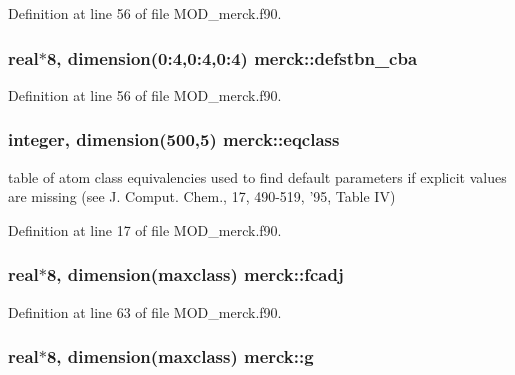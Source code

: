 Definition at line 56 of file M\-O\-D\-\_\-merck.\-f90.

\hypertarget{classmerck_a9738fd062edaa9f9d1d1330938269a2f}{
\subsubsection[{defstbn\-\_\-cba}]{\setlength{\rightskip}{0pt plus 5cm}real$\ast$8, dimension(0\-:4,0\-:4,0\-:4) merck\-::defstbn\-\_\-cba}}\label{classmerck_a9738fd062edaa9f9d1d1330938269a2f}


Definition at line 56 of file M\-O\-D\-\_\-merck.\-f90.

\hypertarget{classmerck_a8eadf59b7bbaa44a94d888299dcb8e35}{
\subsubsection[{eqclass}]{\setlength{\rightskip}{0pt plus 5cm}integer, dimension(500,5) merck\-::eqclass}}\label{classmerck_a8eadf59b7bbaa44a94d888299dcb8e35}


table of atom class equivalencies used to find default parameters if explicit values are missing (see J. Comput. Chem., 17, 490-\/519, '95, Table I\-V) 



Definition at line 17 of file M\-O\-D\-\_\-merck.\-f90.

\hypertarget{classmerck_a101cae3abb5ea422f3baccff3e448ad6}{
\subsubsection[{fcadj}]{\setlength{\rightskip}{0pt plus 5cm}real$\ast$8, dimension(maxclass) merck\-::fcadj}}\label{classmerck_a101cae3abb5ea422f3baccff3e448ad6}


Definition at line 63 of file M\-O\-D\-\_\-merck.\-f90.

\hypertarget{classmerck_a890725e06686aca0d658cd9def7c604a}{
\subsubsection[{g}]{\setlength{\rightskip}{0pt plus 5cm}real$\ast$8, dimension(maxclass) merck\-::g}}\label{classmerck_a890725e06686aca0d658cd9def7c604a}


